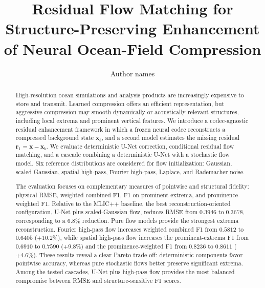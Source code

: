 \documentclass[11pt]{article}
\title{
Residual Flow Matching for Structure-Preserving Enhancement of Neural Ocean-Field Compression
}
\author{
Author names
}
\date{}
\newcommand{\x}{\mathbf{x}}
\newcommand{\xb}{\mathbf{x}_{b}}
\newcommand{\rone}{\mathbf{r}_{1}}
\begin{document}
\maketitle

\begin{abstract}
High-resolution ocean simulations and analysis products are increasingly expensive to store and transmit. Learned compression offers an efficient representation, but aggressive compression may smooth dynamically or acoustically relevant structures, including local extrema and prominent vertical features. We introduce a codec-agnostic residual enhancement framework in which a frozen neural codec reconstructs a compressed background state $\xb$, and a second model estimates the missing residual $\rone=\x-\xb$. We evaluate deterministic U-Net correction, conditional residual flow matching, and a cascade combining a deterministic U-Net with a stochastic flow model. Six reference distributions are considered for flow initialization: Gaussian, scaled Gaussian, spatial high-pass, Fourier high-pass, Laplace, and Rademacher noise.

The evaluation focuses on complementary measures of pointwise and structural fidelity: physical RMSE, weighted combined F1, F1 on prominent extrema, and prominence-weighted F1. Relative to the MLIC++ baseline, the best reconstruction-oriented configuration, U-Net plus scaled-Gaussian flow, reduces RMSE from $0.3946$ to $0.3678$, corresponding to a $6.8\%$ reduction. Pure flow models provide the strongest extrema reconstruction. Fourier high-pass flow increases weighted combined F1 from $0.5812$ to $0.6405$ ($+10.2\%$), while spatial high-pass flow increases the prominent-extrema F1 from $0.6910$ to $0.7590$ ($+9.8\%$) and the prominence-weighted F1 from $0.8236$ to $0.8611$ ($+4.6\%$). These results reveal a clear Pareto trade-off: deterministic components favor pointwise accuracy, whereas pure stochastic flows better preserve significant extrema. Among the tested cascades, U-Net plus high-pass flow provides the most balanced compromise between RMSE and structure-sensitive F1 scores.
\end{abstract}
\end{document}
